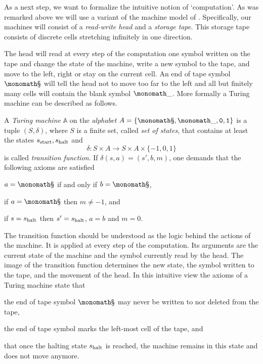 As a next step, we want to formalize the intuitive notion of ‘computation’. As
was remarked above we will use a variant of the machine model of
\textcite{Turing1936}. Specifically, our machines will consist of a
\emph{read-write head} and a \emph{storage tape}. This storage tape consists of
discrete cells stretching infinitely in one direction.

The head will read at every step of the computation one symbol written on the
tape and change the state of the machine, write a new symbol to the tape, and
move to the left, right or stay on the current cell. An end of tape symbol
\(\sta\) will tell the head not to move too far to the left and all but finitely
many cells will contain the blank symbol \(\emp\). More formally a Turing
machine can be described as follows.

\begin{defin}
  A \emph{Turing machine} $\mathbb A$ on the \emph{alphabet} $A = \lbrace \sta,
  \emp, \zer, \one \rbrace$ is a tuple $(S, δ)$, where $S$ is a finite set,
  called \emph{set of states}, that contains at least the states \(s_{\text{start}},
  s_{\text{halt}}\) and
  \[
    δ: S × A → S × A × \lbrace -1, 0, 1 \rbrace
  \]
  is called \emph{transition function}. If $δ(s, a) = (s', b, m)$, one
  demands that the following axioms are satisfied

  \begin{thmlist}
  \item
    $a = \sta$ if and only if $b = \sta$,
  \item
    if $a = \sta$ then $m ≠ -1$, and
  \item
    if $s = s_{\text{halt}}$ then $s' = s_{\text{halt}}$, $a = b$ and $m = 0$.
  \end{thmlist}
\end{defin}

The transition function should be understood as the logic behind the actions of
the machine. It is applied at every step of the computation. Its arguments are
the current state of the machine and the symbol currently read by the head. The
image of the transition function determines the new state, the symbol written to
the tape, and the movement of the head. In this intuitive view the axioms of a
Turing machine state that

\begin{plist}
  \item the end of tape symbol \(\sta\) may never be written to nor deleted
  from the tape,
  \item the end of tape symbol marks the left-most cell of the tape, and
  \item that once the halting state \(s_{\text{halt}}\) is reached, the machine remains
  in this state and does not move anymore.
\end{plist}

